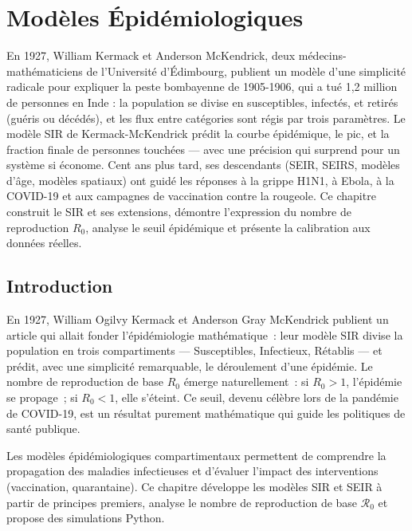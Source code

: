 \chapter{Mod\`eles \'Epid\'emiologiques}
\label{ch:epidemiologie}

En 1927, William Kermack et Anderson McKendrick, deux médecins-mathématiciens de l'Université d'Édimbourg, publient un modèle d'une simplicité radicale pour expliquer la peste bombayenne de 1905-1906, qui a tué 1,2 million de personnes en Inde : la population se divise en susceptibles, infectés, et retirés (guéris ou décédés), et les flux entre catégories sont régis par trois paramètres. Le modèle SIR de Kermack-McKendrick prédit la courbe épidémique, le pic, et la fraction finale de personnes touchées --- avec une précision qui surprend pour un système si économe. Cent ans plus tard, ses descendants (SEIR, SEIRS, modèles d'âge, modèles spatiaux) ont guidé les réponses à la grippe H1N1, à Ebola, à la COVID-19 et aux campagnes de vaccination contre la rougeole. Ce chapitre construit le SIR et ses extensions, démontre l'expression du nombre de reproduction $R_0$, analyse le seuil épidémique et présente la calibration aux données réelles.

\section{Introduction}

En 1927, William Ogilvy Kermack et Anderson Gray McKendrick publient un article qui allait fonder l'\'epid\'emiologie math\'ematique~: leur mod\`ele SIR divise la population en trois compartiments --- Susceptibles, Infectieux, R\'etablis --- et pr\'edit, avec une simplicit\'e remarquable, le d\'eroulement d'une \'epid\'emie. Le nombre de reproduction de base $R_0$ \'emerge naturellement~: si $R_0 > 1$, l'\'epid\'emie se propage~; si $R_0 < 1$, elle s'\'eteint. Ce seuil, devenu c\'el\`ebre lors de la pand\'emie de COVID-19, est un r\'esultat purement math\'ematique qui guide les politiques de sant\'e publique.

Les mod\`eles \'epid\'emiologiques compartimentaux permettent de comprendre
la propagation des maladies infectieuses et d'\'evaluer l'impact des
interventions (vaccination, quarantaine).  Ce chapitre d\'eveloppe les
mod\`eles SIR et SEIR \`a partir de principes premiers, analyse le nombre
de reproduction de base $\mathcal{R}_0$ et propose des simulations Python.

